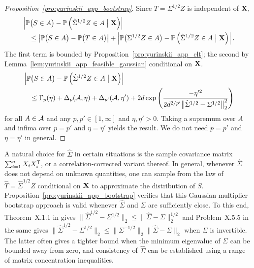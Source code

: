 \begin{proof}[Proposition~\ref{pro:yurinskii_app_bootstrap}]

  Since $T = \Sigma^{1/2} Z$ is independent of $\mathbf{X}$,
  \begin{align*}
    &\left|
    \mathbb{P}\big(S \in A\big)
    - \mathbb{P}\left(\hat \Sigma^{1/2} Z \in A \bigm| \mathbf{X}\right)
    \right| \\
    &\quad\leq
    \left|
    \mathbb{P}\big(S \in A\big)
    - \mathbb{P}\big(T \in A\big)
    \right|
    +\left|
    \mathbb{P}\big(\Sigma^{1/2} Z \in A\big)
    - \mathbb{P}\left(\hat \Sigma^{1/2} Z \in A \bigm| \mathbf{X}\right)
    \right|.
  \end{align*}
  The first term is bounded by Proposition~\ref{pro:yurinskii_app_clt};
  the second by Lemma~\ref{lem:yurinskii_app_feasible_gaussian}
  conditional on $\mathbf{X}$.
  \begin{align*}
    &\left|
    \mathbb{P}\big(S \in A\big)
    - \mathbb{P}\left(\hat \Sigma^{1/2} Z \in A \bigm| \mathbf{X}\right)
    \right| \\
    &\quad\leq
    \Gamma_p(\eta) + \Delta_p(\mathcal{A}, \eta)
    + \Delta_{p'}(\mathcal{A}, \eta')
    + 2 d \exp \left( \frac{-\eta'^2}
      {2 d^{2/p'} \big\|\hat\Sigma^{1/2} - \Sigma^{1/2}\big\|_2^2}
    \right)
  \end{align*}
  for all $A \in \mathcal{A}$
  and any $p, p' \in [1, \infty]$ and $\eta, \eta' > 0$.
  Taking a supremum over $A$ and infima over
  $p = p'$ and $\eta = \eta'$ yields the result.
  We do not need
  $p = p'$ and $\eta = \eta'$ in general.
\end{proof}

A natural choice for $\hat\Sigma$ in certain situations is the sample
covariance matrix $\sum_{i=1}^n X_i X_i^{\mathsf{T}}$, or a correlation-corrected variant
thereof. In general, whenever $\hat \Sigma$ does not depend on unknown
quantities, one can sample from the law of $\hat T = \hat\Sigma^{1/2} Z$
conditional on $\mathbf{X}$ to approximate the distribution of $S$.
Proposition~\ref{pro:yurinskii_app_bootstrap} verifies that this Gaussian
multiplier
bootstrap approach is valid whenever $\hat\Sigma$ and $\Sigma$ are sufficiently
close. To this end, Theorem~X.1.1 in \citet{bhatia1997matrix} gives
$\big\|\hat\Sigma^{1/2} - \Sigma^{1/2}\big\|_2
\leq \big\|\hat\Sigma - \Sigma\big\|_2^{1/2}$
and Problem~X.5.5 in the same gives
$\big\|\hat\Sigma^{1/2} - \Sigma^{1/2}\big\|_2
\leq \big\|\Sigma^{-1/2}\big\|_2 \big\|\hat\Sigma - \Sigma\big\|_2$
when $\Sigma$ is invertible. The latter often gives a tighter bound when the
minimum eigenvalue of $\Sigma$ can be bounded away from zero, and consistency
of $\hat \Sigma$ can be established using a range of matrix concentration
inequalities.

